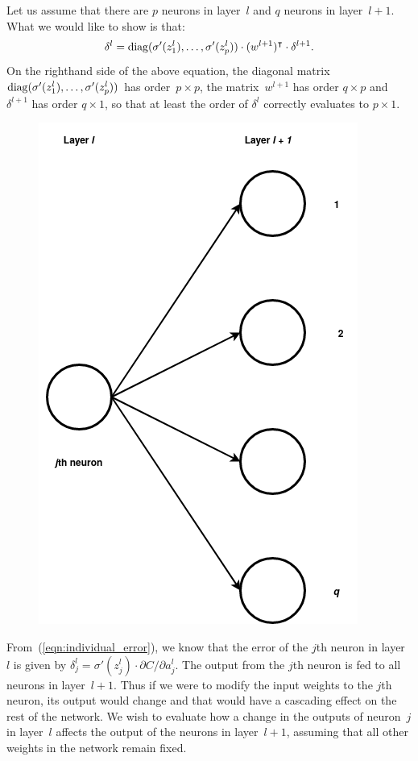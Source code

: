 Let us assume that there are $p$ neurons in layer~$l$ and $q$ neurons in layer~$l + 1$.
What we would like to show is that:
\begin{equation}
\label{eqn:backprop_error}
\delta^l = \operatorname{diag} (\sigma'(z_1^l), \ldots, \sigma'(z_p^l)) \cdot (w^{l + 1})^{\intercal} \cdot \delta^{l + 1}.
\end{equation}
On the righthand side of the above equation, the diagonal matrix
$\operatorname{diag} (\sigma'(z_1^l), \ldots, \sigma'(z_p^l))$ has order~$p \times p$, the
matrix~$w^{l + 1}$ has order $q \times p$ and $\delta^{l + 1}$ has order $q \times 1$,
so that at least the order of $\delta^{l}$ correctly evaluates to $p \times 1$.
\begin{figure}[ht]
\begin{center}
\includegraphics[scale=0.3]{twolayers.png}
\end{center}
\end{figure}

From~(\ref{eqn:individual_error}), we know that the error of the $j$th neuron in
layer~$l$ is given by
$\delta_j^l = \sigma' (z_j^l) \cdot \partial C / \partial a_j^l$. The output from
the $j$th neuron is fed to all neurons in layer~$l + 1$. Thus if we were to modify
the input weights to the $j$th neuron, its output would change and that would have a
cascading effect on the rest of the network. We wish to evaluate
how a change in the outputs of neuron~$j$ in layer~$l$ affects the output of
the neurons in layer~$l + 1$, assuming that all other weights in the network remain
fixed.



